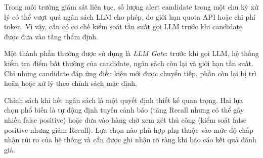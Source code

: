 Trong môi trường giám sát liên tục, số lượng alert candidate trong 
một chu kỳ xử lý có thể vượt quá ngân sách LLM cho phép, do giới 
hạn quota API hoặc chi phí token. Vì vậy, cần có cơ chế kiểm soát 
tần suất gọi LLM trước khi candidate được đưa vào tầng thẩm định.

Một thành phần thường được sử dụng là \textit{LLM Gate}: trước khi 
gọi LLM, hệ thống kiểm tra điểm bất thường của candidate, ngân sách 
còn lại và giới hạn tần suất. Chỉ những candidate đáp ứng điều kiện 
mới được chuyển tiếp, phần còn lại bị trì hoãn hoặc xử lý theo chính 
sách mặc định.

Chính sách khi hết ngân sách là một quyết định thiết kế quan trọng. 
Hai lựa chọn phổ biến là tự động định tuyến cảnh báo (tăng Recall 
nhưng có thể gây nhiều false positive) hoặc đưa vào hàng chờ xem xét 
thủ công (kiểm soát false positive nhưng giảm Recall). Lựa chọn nào 
phù hợp phụ thuộc vào mức độ chấp nhận rủi ro của hệ thống và cần 
được ghi nhận rõ ràng khi báo cáo kết quả đánh giá.